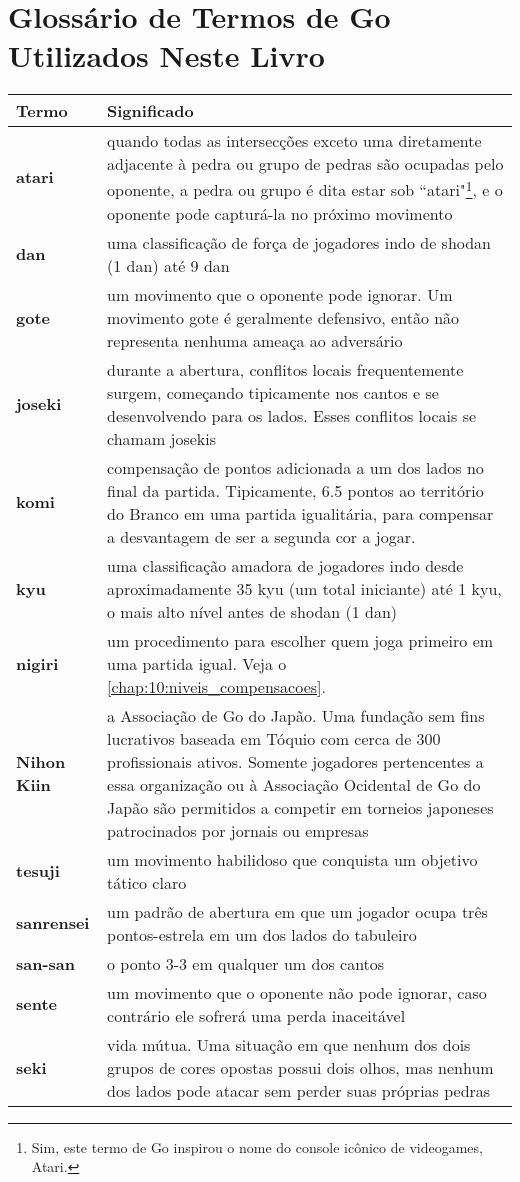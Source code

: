 \chapter{Glossário de Termos de Go Utilizados Neste Livro}

\begin{longtable}{l|p{85mm}} 
 \hline
 \textbf{Termo} & \textbf{Significado} \\
 \hline \hline
 \textbf{atari} & quando todas as intersecções exceto uma diretamente adjacente à pedra ou grupo de pedras são ocupadas pelo oponente, a pedra ou grupo é dita estar sob ``atari"\footnote{Sim, este termo de Go inspirou o nome do console icônico de videogames, Atari.}, e o oponente pode capturá-la no próximo movimento \\ 
 \hline
 \textbf{dan} & uma classificação de força de jogadores indo de shodan (1 dan) até 9 dan \\
 \hline
 \textbf{gote} & um movimento que o oponente pode ignorar. Um movimento gote é geralmente defensivo, então não representa nenhuma ameaça ao adversário \\
 \hline
 \textbf{joseki} & durante a abertura, conflitos locais frequentemente surgem, começando tipicamente nos cantos e se desenvolvendo para os lados. Esses conflitos locais se chamam josekis \\
 \hline
 \textbf{komi} & compensação de pontos adicionada a um dos lados no final da partida. Tipicamente, 6.5 pontos ao território do Branco em uma partida igualitária, para compensar a desvantagem de ser a segunda cor a jogar. \\
 \hline
 \textbf{kyu} & uma classificação amadora de jogadores indo desde aproximadamente 35 kyu (um total iniciante) até 1 kyu, o mais alto nível antes de shodan (1 dan) \\
 \hline
 \textbf{nigiri} & um procedimento para escolher quem joga primeiro em uma partida igual. Veja o \autoref{chap:10:niveis_compensacoes}. \\
 \hline
 \textbf{Nihon Kiin} & a Associação de Go do Japão. Uma fundação sem fins lucrativos baseada em Tóquio com cerca de 300 profissionais ativos. Somente jogadores pertencentes a essa organização ou à Associação Ocidental de Go do Japão são permitidos a competir em torneios japoneses patrocinados por jornais ou empresas \\
 \hline
 \textbf{tesuji} & um movimento habilidoso que conquista um objetivo tático claro \\
 \hline
 \textbf{sanrensei} & um padrão de abertura em que um jogador ocupa três pontos-estrela em um dos lados do tabuleiro \\
 \hline
 \textbf{san-san} & o ponto 3-3 em qualquer um dos cantos \\
 \hline
 \textbf{sente} & um movimento que o oponente não pode ignorar, caso contrário ele sofrerá uma perda inaceitável \\
 \hline
 \textbf{seki} & vida mútua. Uma situação em que nenhum dos dois grupos de cores opostas possui dois olhos, mas nenhum dos lados pode atacar sem perder suas próprias pedras \\
 \hline
\end{longtable}